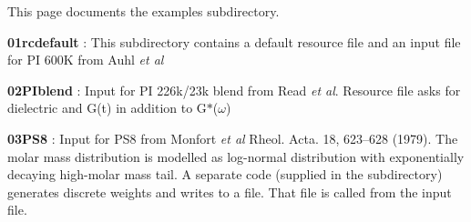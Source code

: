 This page documents the examples subdirectory.


\begin{DoxyItemize}
\item {\bfseries{01rcdefault}} \+: This subdirectory contains a default resource file and an input file for PI 600K from Auhl {\itshape et al}
\item {\bfseries{02PIblend}} \+: Input for PI 226k/23k blend from Read {\itshape et al}. Resource file asks for dielectric and G(t) in addition to G$\ast$({$\omega$})
\item {\bfseries{03PS8}} \+: Input for PS8 from Monfort {\itshape et al} Rheol. Acta. 18, 623–628 (1979). The molar mass distribution is modelled as log-\/normal distribution with exponentially decaying high-\/molar mass tail. A separate code (supplied in the subdirectory) generates discrete weights and writes to a file. That file is called from the input file. 
\end{DoxyItemize}